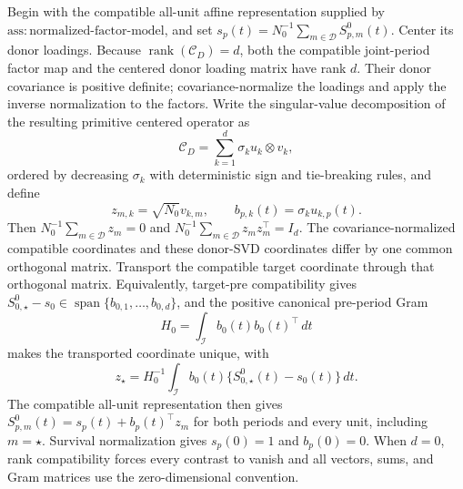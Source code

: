 Begin with the compatible all-unit affine representation supplied by \(\mathrm{ass:normalized\mbox{-}factor\mbox{-}model}\), and set \(s_p(t)=N_0^{-1}\sum_{m\in\mathcal D}S^0_{p,m}(t)\). Center its donor loadings. Because \(\operatorname{rank}(\mathcal C_D)=d\), both the compatible joint-period factor map and the centered donor loading matrix have rank \(d\). Their donor covariance is positive definite; covariance-normalize the loadings and apply the inverse normalization to the factors. Write the singular-value decomposition of the resulting primitive centered operator as
\[
 \mathcal C_D=\sum_{k=1}^d\sigma_k u_k\otimes v_k,
\]
ordered by decreasing \(\sigma_k\) with deterministic sign and tie-breaking rules, and define
\[
 z_{m,k}=\sqrt{N_0}v_{k,m},
 \qquad b_{p,k}(t)=\sigma_k u_{k,p}(t).
\]
Then \(N_0^{-1}\sum_{m\in\mathcal D}z_m=0\) and \(N_0^{-1}\sum_{m\in\mathcal D}z_mz_m^\top=I_d\). The covariance-normalized compatible coordinates and these donor-SVD coordinates differ by one common orthogonal matrix. Transport the compatible target coordinate through that orthogonal matrix. Equivalently, target-pre compatibility gives \(S^0_{0,\star}-s_0\in\operatorname{span}\{b_{0,1},\ldots,b_{0,d}\}\), and the positive canonical pre-period Gram
\[
 H_0=\int_{\mathcal I}b_0(t)b_0(t)^\top\,dt
\]
makes the transported coordinate unique, with
\[
 z_\star=H_0^{-1}\int_{\mathcal I}b_0(t)\{S^0_{0,\star}(t)-s_0(t)\}\,dt.
\]
The compatible all-unit representation then gives \(S^0_{p,m}(t)=s_p(t)+b_p(t)^\top z_m\) for both periods and every unit, including \(m=\star\). Survival normalization gives \(s_p(0)=1\) and \(b_p(0)=0\). When \(d=0\), rank compatibility forces every contrast to vanish and all vectors, sums, and Gram matrices use the zero-dimensional convention.